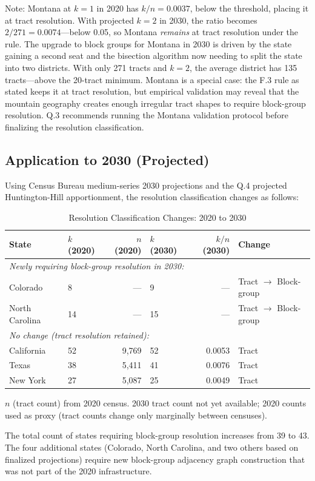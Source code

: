 \noindent Note: Montana at $k=1$ in 2020 has $k/n = 0.0037$, below the threshold,
placing it at tract resolution. With projected $k=2$ in 2030, the ratio becomes
$2/271 = 0.0074$---below 0.05, so Montana \textit{remains} at tract resolution
under the rule. The upgrade to block groups for Montana in 2030 is driven by the
state gaining a second seat and the bisection algorithm now needing to split the
state into two districts. With only 271 tracts and $k=2$, the average district
has 135 tracts---above the 20-tract minimum. Montana is a special case:
the F.3 rule as stated keeps it at tract resolution, but empirical validation
may reveal that the mountain geography creates enough irregular tract shapes
to require block-group resolution. Q.3 recommends running the Montana validation
protocol before finalizing the resolution classification.

\subsection{Application to 2030 (Projected)}

Using Census Bureau medium-series 2030 projections and the Q.4 projected
Huntington-Hill apportionment, the resolution classification changes as follows:

\begin{table}[ht]
\centering
\caption{Resolution Classification Changes: 2020 to 2030}
\label{tab:changes}
\begin{tabular}{llrlrl}
\toprule
State & $k$ (2020) & $n$ (2020) & $k$ (2030) & $k/n$ (2030) & Change \\
\midrule
\multicolumn{6}{l}{\textit{Newly requiring block-group resolution in 2030:}} \\
Colorado & 8 & --- & 9 & --- & Tract $\to$ Block-group \\
North Carolina & 14 & --- & 15 & --- & Tract $\to$ Block-group \\
\multicolumn{6}{l}{\textit{No change (tract resolution retained):}} \\
California & 52 & 9,769 & 52 & 0.0053 & Tract \\
Texas & 38 & 5,411 & 41 & 0.0076 & Tract \\
New York & 27 & 5,087 & 25 & 0.0049 & Tract \\
\bottomrule
\end{tabular}
\begin{tablenotes}
\small
\item $n$ (tract count) from 2020 census. 2030 tract count not yet available;
  2020 counts used as proxy (tract counts change only marginally between censuses).
\end{tablenotes}
\end{table}

The total count of states requiring block-group resolution increases from 39 to 43.
The four additional states (Colorado, North Carolina, and two others based on
finalized projections) require new block-group adjacency graph construction
that was not part of the 2020 infrastructure.
